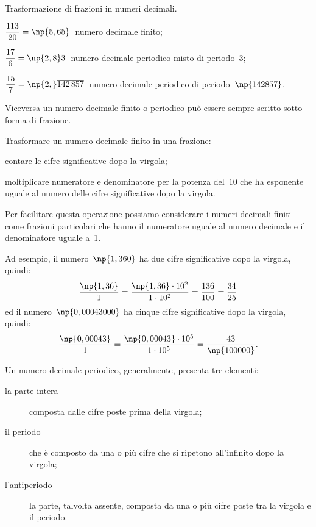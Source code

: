 \begin{exrig}
 \begin{esempio}
 Trasformazione di frazioni in numeri decimali.
  \begin{center}
  	
  \end{center}	
  \begin{enumeratea}
  \item $\dfrac{113}{20}=\np{5,65}\:$ numero decimale finito;\vspace{1.03ex}
  \item $\dfrac{17}{6}=\np{2,8}\overline{3}\:$ numero decimale periodico misto di periodo~3;\vspace{1.03ex}
  \item $\dfrac{15}{7}=\np{2,}\overline{142\,857}\:$ numero decimale periodico di periodo~$\np{142857}$.
  \end{enumeratea}
 \end{esempio}
\end{exrig}

\ovalbox{\risolvi \ref{ese:3.24}, \ref{ese:3.25}, \ref{ese:3.26}}\vspazio

Viceversa un numero decimale finito o periodico può essere sempre scritto sotto forma di frazione.

\begin{procedura}
	Trasformare un numero decimale finito in una frazione:
\begin{enumeratea}
 \item contare le cifre significative dopo la virgola;
 \item moltiplicare numeratore e denominatore per la potenza del~$10$ che ha esponente uguale al
	 numero delle cifre significative dopo la virgola.
\end{enumeratea}
\end{procedura}

Per facilitare questa operazione possiamo considerare i numeri decimali finiti come frazioni
particolari che hanno il numeratore uguale al numero decimale e il denominatore uguale a~1.

Ad esempio, il numero~$\np{1,360}$ ha due cifre significative dopo la virgola, quindi:
\[\frac{\np{1,36}}{1}=\frac{\np{1,36}\cdot10^2}{1\cdot10^2}=\frac{136}{100}=\frac{34}{25}\]
ed il numero~$\np{0,00043000}$ ha cinque cifre significative dopo la virgola, quindi:
\[\frac{\np{0,00043}}{1}=\frac{\np{0,00043}\cdot10^5}{1\cdot10^5}=\frac{43}{\np{100000}}.\]

Un numero decimale periodico, generalmente, presenta tre elementi:
\begin{description}
 \item [la parte intera] composta dalle cifre poste prima della virgola;
 \item [il periodo] che è composto da una o più cifre che si ripetono all'infinito dopo la virgola;
 \item [l'antiperiodo] la parte, talvolta assente, composta da una o più cifre poste tra la virgola e il periodo.
\end{description}


